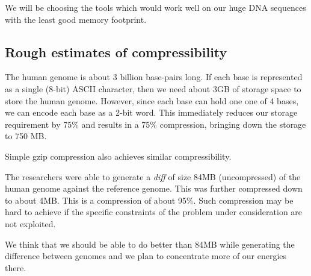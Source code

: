 \documentclass[11pt,twocolumn]{article}
\begin{document}
We will be choosing the tools which would work well on our huge 
DNA sequences with the least good memory footprint. 

\subsection*{Rough estimates of compressibility}

The human genome is about 3 billion base-pairs long. If each base is
represented as a single (8-bit) ASCII character, then we need about
3GB of storage space to store the human genome. However, since each
base can hold one one of 4 bases, we can encode each base as a 2-bit
word. This immediately reduces our storage requirement by 75\% and
results in a 75\% compression, bringing down the storage to 750 MB.

Simple gzip compression also achieves similar compressibility.

The researchers were able to generate a \textit{diff} of size 84MB
(uncompressed) of the human genome against the reference genome. This
was further compressed down to about 4MB. This is a compression of
about 95\%. Such compression may be hard to achieve if the specific
constraints of the problem under consideration are not exploited.

We think that we should be able to do better than 84MB while
generating the difference between genomes and we plan to concentrate
more of our energies there.

\clearpage

\end{document}
